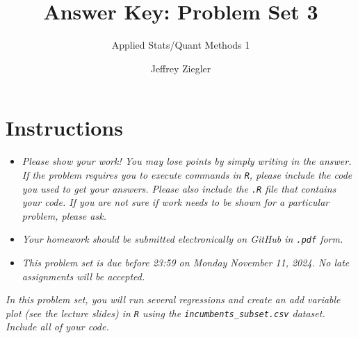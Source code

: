 \documentclass[12pt,letterpaper]{article}
\title{Answer Key: Problem Set 3}
\date{Jeffrey Ziegler}
\author{Applied Stats/Quant Methods 1}
\begin{document}
	\maketitle
	
	\section*{Instructions}
	\begin{itemize}
		\item \textit{Please show your work! You may lose points by simply writing in the answer. If the problem requires you to execute commands in \texttt{R}, please include the code you used to get your answers. Please also include the \texttt{.R} file that contains your code. If you are not sure if work needs to be shown for a particular problem, please ask.}
		\item \textit{Your homework should be submitted electronically on GitHub in \texttt{.pdf} form.}
		\item \textit{This problem set is due before 23:59 on Monday November 11, 2024. No late assignments will be accepted.}

	\end{itemize}
	\vspace{.25cm}
	
	\noindent \emph{In this problem set, you will run several regressions and create an add variable plot (see the lecture slides) in \texttt{R} using the \texttt{incumbents\_subset.csv} dataset. Include all of your code.}
	
	\vspace{.5cm}
\end{document}
